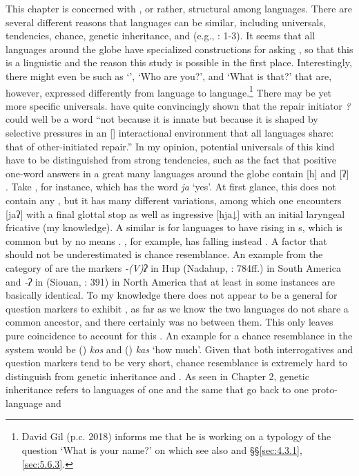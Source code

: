 This chapter is concerned with , or rather, structural  among languages. There are several different reasons that languages can be similar, including universals, tendencies, chance, genetic inheritance, and  (e.g., \citealt{AikhenvaldDixon2001}: 1-3). It seems that all languages around the globe have specialized constructions for asking , so that this is a linguistic  and the reason this study is possible in the first place. Interestingly, there might even be  such as ‘’, ‘Who are you?’, and ‘What is that?’ that are, however, expressed differently from language to language.\footnote{David Gil (p.c. 2018) informs me that he is working on a typology of the question ‘What is your name?’ on which see also \cite{Idiatov2007,Hölzl2014b} and §§\ref{sec:4.3.1}, \ref{sec:5.6.3}.} There may be yet more specific universals. \citet[1]{DingemanseTorreiraEnfield2013} have quite convincingly shown that the repair initiator \textit{?} could well be a  word “not because it is innate but because it is shaped by selective pressures in an [] interactional environment that all languages share: that of other-initiated repair.” In my opinion, potential universals of this kind have to be distinguished from strong tendencies, such as the fact that positive one-word answers in a great many languages around the globe contain  [h] and [ʔ] \citep{Parker2006}. Take , for instance, which has the word \textit{ja} ‘yes’. At first glance, this does not contain any , but it has many different variations, among which one encounters [jaʔ] with a final glottal stop as well as ingressive [hja↓] with an initial laryngeal fricative (my knowledge). A similar  is for languages to have rising  in s, which is common but by no means . , for example, has falling  instead \citep[353]{Veluppilai2012}. A factor that should not be underestimated is chance resemblance. An example from the category of  are the  markers \textit{-(V)ʔ} in Hup (Nadahup, \citealt{Epps2008}: 784ff.) in South America and \textit{-ʔ} in  (Siouan, \citealt{Graczyk2007}: 391) in North America that at least in some instances are basically identical. To my knowledge there does not appear to be a general  for question markers to exhibit , as far as we know the two languages do not share a common ancestor, and there certainly was no  between them. This only leaves pure coincidence to account for this . An example for a chance resemblance in the  system would be  () \textit{kos} and  () \textit{kas} ‘how much’. Given that both interrogatives and question markers tend to be very short, chance resemblance is extremely hard to distinguish from genetic inheritance and . As seen in Chapter 2, genetic inheritance refers to languages of one and the same  that go back to one proto-language and 